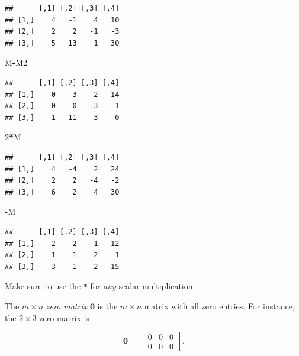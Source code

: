 \documentclass[
]{book}
\newenvironment{Shaded}{\begin{snugshade}}{\end{snugshade}}
\newcommand{\DecValTok}[1]{\textcolor[rgb]{0.00,0.00,0.81}{#1}}
\newcommand{\NormalTok}[1]{#1}
\newcommand{\SpecialCharTok}[1]{\textcolor[rgb]{0.81,0.36,0.00}{\textbf{#1}}}
\theoremstyle{definition}
\theoremstyle{definition}
\theoremstyle{definition}
\theoremstyle{definition}
\theoremstyle{remark}
\begin{document}
\begin{verbatim}
##      [,1] [,2] [,3] [,4]
## [1,]    4   -1    4   10
## [2,]    2    2   -1   -3
## [3,]    5   13    1   30
\end{verbatim}

\begin{Shaded}
\begin{Highlighting}[]
\NormalTok{M}\SpecialCharTok{{-}}\NormalTok{M2}
\end{Highlighting}
\end{Shaded}

\begin{verbatim}
##      [,1] [,2] [,3] [,4]
## [1,]    0   -3   -2   14
## [2,]    0    0   -3    1
## [3,]    1  -11    3    0
\end{verbatim}

\begin{Shaded}
\begin{Highlighting}[]
\DecValTok{2}\SpecialCharTok{*}\NormalTok{M}
\end{Highlighting}
\end{Shaded}

\begin{verbatim}
##      [,1] [,2] [,3] [,4]
## [1,]    4   -4    2   24
## [2,]    2    2   -4   -2
## [3,]    6    2    4   30
\end{verbatim}

\begin{Shaded}
\begin{Highlighting}[]
\SpecialCharTok{{-}}\NormalTok{M}
\end{Highlighting}
\end{Shaded}

\begin{verbatim}
##      [,1] [,2] [,3] [,4]
## [1,]   -2    2   -1  -12
## [2,]   -1   -1    2    1
## [3,]   -3   -1   -2  -15
\end{verbatim}

Make sure to use the \texttt{*} for \emph{any} scalar multiplication.

The \(m\times n\) \emph{zero matrix} \(\mathbf{0}\) is the \(m\times n\) matrix with all zero entries. For instance, the \(2\times 3\) zero matrix is

\[\mathbf{0}=
\begin{bmatrix}
0 & 0 & 0\\0 & 0 & 0
\end{bmatrix}.\]
\end{document}
